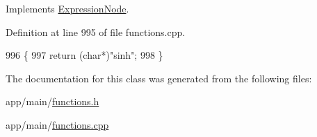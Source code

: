 Implements \hyperlink{classExpressionNode_a42a5e9562b0f645a19dcc83f698069b5}{Expression\+Node}.



Definition at line 995 of file functions.\+cpp.


\begin{DoxyCode}
996 \{
997     \textcolor{keywordflow}{return} (\textcolor{keywordtype}{char}*)\textcolor{stringliteral}{"sinh"};
998 \}
\end{DoxyCode}


The documentation for this class was generated from the following files\+:\begin{DoxyCompactItemize}
\item 
app/main/\hyperlink{functions_8h}{functions.\+h}\item 
app/main/\hyperlink{functions_8cpp}{functions.\+cpp}\end{DoxyCompactItemize}
